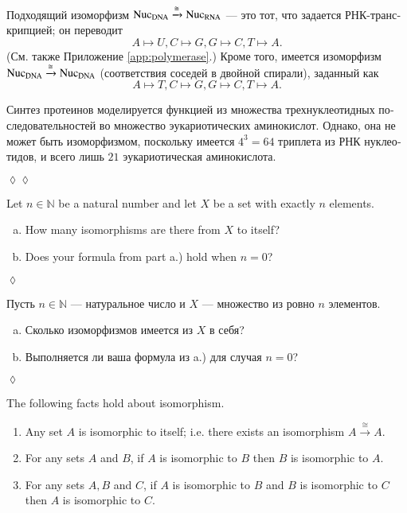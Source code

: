\documentclass{book}
\def\tn{\textnormal}
\def\NN{{\mathbb N}}
\def\iso{\cong}
\newcommand{\To}[1]{\xrightarrow{#1}}
\theoremstyle{theoremENG}
\theoremstyle{lemmaENG}
\newtheorem{lemmaENG}[subsubsection]{\begin{english}Lemma\end{english}}
\theoremstyle{propositionENG}
\theoremstyle{corollaryENG}
\theoremstyle{factENG}
\theoremstyle{remarkENG}
\theoremstyle{exampleENG}
\theoremstyle{warningENG}
\theoremstyle{questionENG}
\theoremstyle{guessENG}
\theoremstyle{answerENG}
\theoremstyle{constructionENG}
\theoremstyle{rulesENG}
\theoremstyle{excENG}
\newtheorem{excENG}[subsubsection]{\begin{english}Exercise\end{english}}
\theoremstyle{appENG}
\theoremstyle{definitionENG}
\theoremstyle{notationENG}
\theoremstyle{conjectureENG}
\theoremstyle{postulateENG}
\newenvironment{exerciseENG}{\begin{excENG}}{\hspace*{\fill}$\lozenge$\end{excENG}}
\theoremstyle{theoremRUS}
\theoremstyle{lemmaRUS}
\theoremstyle{propositionRUS}
\theoremstyle{corollaryRUS}
\theoremstyle{factRUS}
\theoremstyle{remarkRUS}
\theoremstyle{exampleRUS}
\theoremstyle{warningRUS}
\theoremstyle{questionRUS}
\theoremstyle{guessRUS}
\theoremstyle{answerRUS}
\theoremstyle{constructionRUS}
\theoremstyle{rulesRUS}
\theoremstyle{excRUS}
\newtheorem{excRUS}[subsubsection]{\begin{russian}Упражнение\end{russian}}
\theoremstyle{appRUS}
\newtheorem{appRUS}[subsubsection]{\begin{russian}Прикладной пример (применение)\end{russian}}
\theoremstyle{definitionRUS}
\theoremstyle{notationRUS}
\theoremstyle{conjectureRUS}
\theoremstyle{postulateRUS}
\newenvironment{exerciseRUS}{\begin{excRUS}}{\hspace*{\fill}$\lozenge$\end{excRUS}}
\newenvironment{applicationRUS}{\begin{appRUS}}{\hspace*{\fill}$\lozenge\lozenge$\end{appRUS}}
\def\sexc{\begin{enumerate}[a.)]\setlength{\itemsep}{.1cm}\setlength{\parskip}{.1cm}\item}
\def\next{\item}
\def\endsexc{\end{enumerate}}
\begin{document}
\begin{english}
\begin{applicationRUS}
\begin{russian}Подходящий изоморфизм $\tn{Nuc}_\tn{DNA}\To{\iso}\tn{Nuc}_\tn{RNA}$ — это тот, что задается РНК-транскрипцией; он переводит
$$A\mapsto U, C\mapsto G, G\mapsto C, T\mapsto A.$$ 
(См. также Приложение \ref{app:polymerase}.) Кроме того, имеется изоморфизм $\tn{Nuc}_\tn{DNA}\To{\iso}\tn{Nuc}_\tn{DNA}$ (соответствия соседей в двойной спирали), заданный как  
$$A\mapsto T, C\mapsto G, G\mapsto C, T\mapsto A.$$\end{russian}

\begin{russian}Синтез протеинов моделируется функцией из множества трехнуклеотидных последовательностей во множество эукариотических аминокислот. Однако, она не может быть изоморфизмом, поскольку имеется $4^3=64$ триплета из РНК нуклеотидов, и всего лишь $21$ эукариотическая аминокислота. \end{russian}
\end{applicationRUS}

\begin{exerciseENG}
Let $n\in\NN$ be a natural number and let $X$ be a set with exactly $n$ elements. 
\sexc How many isomorphisms are there from $X$ to itself? 
\next Does your formula from part a.) hold when $n=0$?
\endsexc
\end{exerciseENG}

\begin{exerciseRUS}
\begin{russian}
Пусть $n\in\NN$ — натуральное число и $X$ — множество из ровно $n$ элементов. 
\sexc Сколько изоморфизмов имеется из $X$ в себя? 
\next Выполняется ли ваша формула из a.) для случая $n=0$?
\endsexc 
\end{russian}
\end{exerciseRUS}

\begin{lemmaENG}\label{lemma:isomorphic ER in Set}
The following facts hold about isomorphism.
\begin{enumerate}
\item Any set $A$ is isomorphic to itself; i.e. there exists an isomorphism $A\To{\iso} A$.
\item For any sets $A$ and $B$, if $A$ is isomorphic to $B$ then $B$ is isomorphic to $A$.
\item For any sets $A, B$ and $C$, if $A$ is isomorphic to $B$ and $B$ is isomorphic to $C$ then $A$ is isomorphic to $C$.
\end{enumerate}
\end{lemmaENG}


\end{english}
\end{document}
